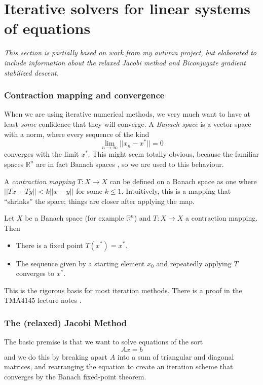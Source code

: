 \section{Iterative solvers for linear systems of equations}
\label{sec:iterative-solvers}
\textit{This section is partially based on work from my autumn
project, but elaborated to include information about
the relaxed Jacobi method and
Biconjugate gradient stabilized descent.}\\[.05em]

\subsubsection*{Contraction mapping and convergence}
When we are using iterative numerical methods, we very much want to have
at least {\em some} confidence that they will converge.
A {\em Banach space} is a vector space with a norm,
where every sequence of the kind
$$
    \lim_{n \rightarrow \infty} ||x_n - x^*|| = 0
$$
converges with the limit $x^*$. \cite{tma4145}
This might seem totally obvious, because the familiar spaces $\mathbb R^n$
are in fact Banach spaces \cite{tma4145}, so we are used to this behaviour.

A {\em contraction mapping} $T: X \rightarrow X$ can be defined on a Banach space
as one where $||Tx - Ty|| < k ||x - y||$ for some $k\leq 1$. Intuitively, this is a mapping that ``shrinks''
the space; things are closer after applying the map.

\begin{theorem}
Let $X$ be a Banach space (for example $\mathbb R^n$) and $T : X \rightarrow X$
a contraction mapping. Then
\begin{itemize}
\item There is a fixed point $T(x^*) = x^*$.
\item The sequence given by a starting element $x_0$ and repeatedly applying $T$ converges to $x^*$.
\end{itemize}
\end{theorem}

\noindent This is the rigorous basis for most iteration methods.
There is a proof in the TMA4145 lecture notes \cite{tma4145}. 

\subsubsection*{The (relaxed) Jacobi Method}

The basic premise is that we want to solve equations of the sort
$$
Ax = b
$$
and we do this by breaking apart $A$ into a sum of triangular and diagonal matrices,
and rearranging the equation to create an iteration scheme that converges by the
Banach fixed-point theorem.

